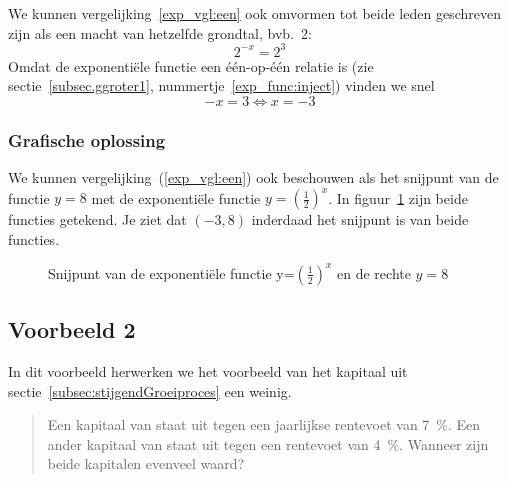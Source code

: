  We kunnen vergelijking~\eqref{exp_vgl:een} ook omvormen tot beide leden
 geschreven zijn als een macht van hetzelfde grondtal, bvb.\ 2:
 \begin{displaymath}
     2^{-x}=2^{3}
 \end{displaymath}
Omdat  de exponenti\"ele functie een één-op-één relatie is (zie sectie~\ref{subsec.ggroter1}, nummertje~\ref{exp_func:inject}) vinden we snel
\begin{displaymath}
    -x=3 \Leftrightarrow x=-3
\end{displaymath}


\subsubsection{Grafische oplossing}
We kunnen vergelijking~(\ref{exp_vgl:een}) ook beschouwen als het snijpunt van de functie $y=8$ met 
de exponenti\"{e}le functie
$y=\left(\frac{1}{2}\right)^{x}$. In figuur~\ref{fig:snijp1} zijn beide functies getekend. Je ziet dat $(-3,8)$ inderdaad het snijpunt is van beide functies. 
\begin{figure}[htbp]
    \centering
    \caption{Snijpunt van de exponenti\"{e}le functie y=$(\frac12)^x$ en de rechte $y=8$}
    \label{fig:snijp1}
\end{figure}



\subsection{Voorbeeld 2}
In dit voorbeeld herwerken we het voorbeeld van het kapitaal uit sectie~\ref{subsec:stijgendGroeiproces} een weinig.
\begin{quote}

Een kapitaal van  staat uit tegen een
jaarlijkse rentevoet van \SI{7}{\percent}. Een ander kapitaal van  staat uit tegen een rentevoet van \SI{4}{\percent}. Wanneer zijn beide kapitalen evenveel waard?
\end{quote}


